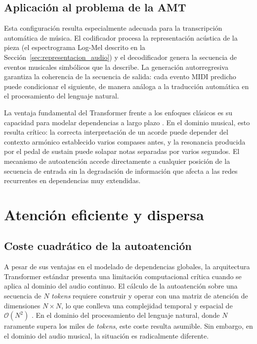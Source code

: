 \subsection{Aplicación al problema de la AMT}

Esta configuración resulta especialmente adecuada para la transcripción
automática de música. El codificador procesa la representación acústica
de la pieza (el espectrograma Log-Mel descrito en la
Sección~\ref{sec:representacion_audio}) y el decodificador genera la
secuencia de eventos musicales simbólicos que la describe. La generación
autorregresiva garantiza la coherencia de la secuencia de salida: cada
evento MIDI predicho puede condicionar el siguiente, de manera análoga
a la traducción automática en el procesamiento del lenguaje natural.

La ventaja fundamental del Transformer frente a los enfoques clásicos es
su capacidad para modelar dependencias a largo plazo
\cite{vaswani2017attention}. En el dominio musical, esto resulta crítico:
la correcta interpretación de un acorde puede depender del contexto
armónico establecido varios compases antes, y la resonancia producida por
el pedal de sustain puede solapar notas separadas por varios segundos. El
mecanismo de autoatención accede directamente a cualquier posición de la
secuencia de entrada sin la degradación de información que afecta a las
redes recurrentes en dependencias muy extendidas.
 
\section{Atención eficiente y dispersa}

\subsection{Coste cuadrático de la autoatención}

A pesar de sus ventajas en el modelado de dependencias globales, la
arquitectura Transformer estándar presenta una limitación computacional
crítica cuando se aplica al dominio del audio continuo. El cálculo de la
autoatención sobre una secuencia de $N$ \textit{tokens} requiere
construir y operar con una matriz de atención de dimensiones $N \times N$,
lo que conlleva una complejidad temporal y espacial de
$\mathcal{O}(N^2)$ \cite{vaswani2017attention}. En el dominio del
procesamiento del lenguaje natural, donde $N$ raramente supera los miles
de \textit{tokens}, este coste resulta asumible. Sin embargo, en el
dominio del audio musical, la situación es radicalmente diferente.

